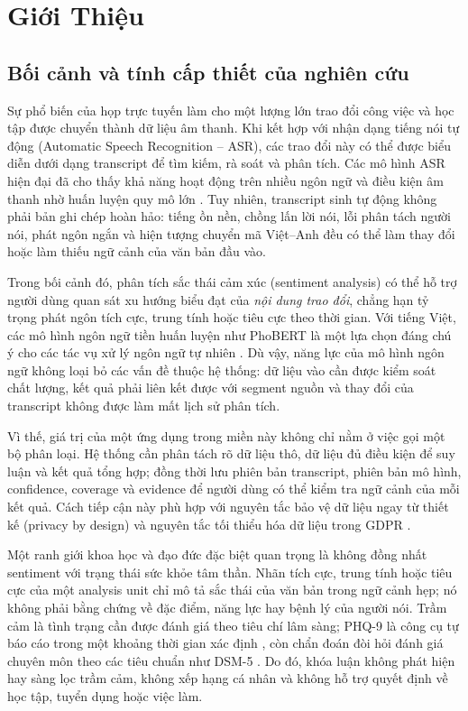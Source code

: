 \chapter{Giới Thiệu}
\label{chap:intro}

\section{Bối cảnh và tính cấp thiết của nghiên cứu}
Sự phổ biến của họp trực tuyến làm cho một lượng lớn trao đổi công việc và học tập được chuyển thành dữ liệu âm thanh. Khi kết hợp với nhận dạng tiếng nói tự động (Automatic Speech Recognition -- ASR), các trao đổi này có thể được biểu diễn dưới dạng transcript để tìm kiếm, rà soát và phân tích. Các mô hình ASR hiện đại đã cho thấy khả năng hoạt động trên nhiều ngôn ngữ và điều kiện âm thanh nhờ huấn luyện quy mô lớn \cite{whisper2022}. Tuy nhiên, transcript sinh tự động không phải bản ghi chép hoàn hảo: tiếng ồn nền, chồng lấn lời nói, lỗi phân tách người nói, phát ngôn ngắn và hiện tượng chuyển mã Việt--Anh đều có thể làm thay đổi hoặc làm thiếu ngữ cảnh của văn bản đầu vào.

Trong bối cảnh đó, phân tích sắc thái cảm xúc (sentiment analysis) có thể hỗ trợ người dùng quan sát xu hướng biểu đạt của \emph{nội dung trao đổi}, chẳng hạn tỷ trọng phát ngôn tích cực, trung tính hoặc tiêu cực theo thời gian. Với tiếng Việt, các mô hình ngôn ngữ tiền huấn luyện như PhoBERT là một lựa chọn đáng chú ý cho các tác vụ xử lý ngôn ngữ tự nhiên \cite{phobert2020}. Dù vậy, năng lực của mô hình ngôn ngữ không loại bỏ các vấn đề thuộc hệ thống: dữ liệu vào cần được kiểm soát chất lượng, kết quả phải liên kết được với segment nguồn và thay đổi của transcript không được làm mất lịch sử phân tích.

Vì thế, giá trị của một ứng dụng trong miền này không chỉ nằm ở việc gọi một bộ phân loại. Hệ thống cần phân tách rõ dữ liệu thô, dữ liệu đủ điều kiện để suy luận và kết quả tổng hợp; đồng thời lưu phiên bản transcript, phiên bản mô hình, confidence, coverage và evidence để người dùng có thể kiểm tra ngữ cảnh của mỗi kết quả. Cách tiếp cận này phù hợp với nguyên tắc bảo vệ dữ liệu ngay từ thiết kế (privacy by design) \cite{cavoukian2011} và nguyên tắc tối thiểu hóa dữ liệu trong GDPR \cite{gdpr2016}.

Một ranh giới khoa học và đạo đức đặc biệt quan trọng là không đồng nhất sentiment với trạng thái sức khỏe tâm thần. Nhãn tích cực, trung tính hoặc tiêu cực của một analysis unit chỉ mô tả sắc thái của văn bản trong ngữ cảnh hẹp; nó không phải bằng chứng về đặc điểm, năng lực hay bệnh lý của người nói. Trầm cảm là tình trạng cần được đánh giá theo tiêu chí lâm sàng; PHQ-9 là công cụ tự báo cáo trong một khoảng thời gian xác định \cite{kroenke2001}, còn chẩn đoán đòi hỏi đánh giá chuyên môn theo các tiêu chuẩn như DSM-5 \cite{dsm5}. Do đó, khóa luận không phát hiện hay sàng lọc trầm cảm, không xếp hạng cá nhân và không hỗ trợ quyết định về học tập, tuyển dụng hoặc việc làm.

